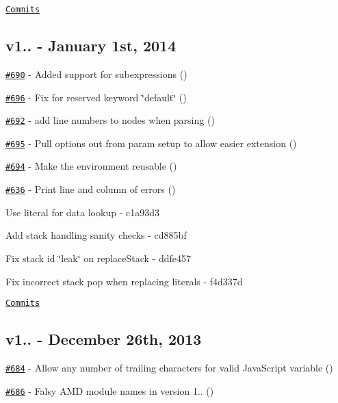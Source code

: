 \href{https://github.com/wycats/handlebars.js/compare/v1.3.0...v2.0.0-alpha.1}{\tt Commits}

\subsection*{v1.. -\/ January 1st, 2014}


\begin{DoxyItemize}
\item \href{https://github.com/wycats/handlebars.js/pull/690}{\tt \#690} -\/ Added support for subexpressions (\href{https://api.github.com/users/machty}{\tt })
\item \href{https://github.com/wycats/handlebars.js/pull/696}{\tt \#696} -\/ Fix for reserved keyword \char`\"{}default\char`\"{} (\href{https://api.github.com/users/nateirwin}{\tt })
\item \href{https://github.com/wycats/handlebars.js/pull/692}{\tt \#692} -\/ add line numbers to nodes when parsing (\href{https://api.github.com/users/fivetanley}{\tt })
\item \href{https://github.com/wycats/handlebars.js/pull/695}{\tt \#695} -\/ Pull options out from param setup to allow easier extension (\href{https://api.github.com/users/blakeembrey}{\tt })
\item \href{https://github.com/wycats/handlebars.js/pull/694}{\tt \#694} -\/ Make the environment reusable (\href{https://api.github.com/users/blakeembrey}{\tt })
\item \href{https://github.com/wycats/handlebars.js/issues/636}{\tt \#636} -\/ Print line and column of errors (\href{https://api.github.com/users/sgronblo}{\tt })
\item Use literal for data lookup -\/ c1a93d3
\item Add stack handling sanity checks -\/ cd885bf
\item Fix stack id \char`\"{}leak\char`\"{} on replace\+Stack -\/ ddfe457
\item Fix incorrect stack pop when replacing literals -\/ f4d337d
\end{DoxyItemize}

\href{https://github.com/wycats/handlebars.js/compare/v1.2.1...v1.3.0}{\tt Commits}

\subsection*{v1.. -\/ December 26th, 2013}


\begin{DoxyItemize}
\item \href{https://github.com/wycats/handlebars.js/pull/684}{\tt \#684} -\/ Allow any number of trailing characters for valid Java\+Script variable (\href{https://api.github.com/users/blakeembrey}{\tt })
\item \href{https://github.com/wycats/handlebars.js/pull/686}{\tt \#686} -\/ Falsy A\+M\+D module names in version 1.. (\href{https://api.github.com/users/kpdecker}{\tt })
\end{DoxyItemize}

